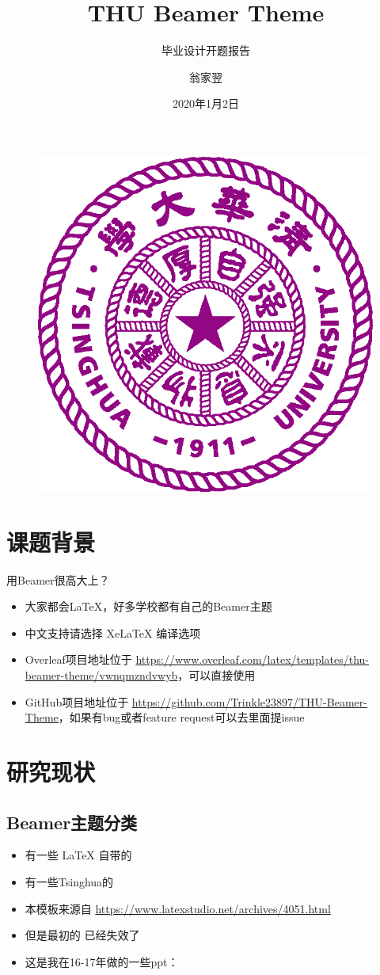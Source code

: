 \documentclass{beamer}
\author{翁家翌}
\title{THU Beamer Theme}
\subtitle{毕业设计开题报告}
\institute{清华大学计算机科学与技术系}
\date{2020年1月2日}
\begin{document}
\kaishu
\begin{frame}
	\titlepage
	\begin{figure}[htpb]
		\begin{center}
			\includegraphics[width=0.2\linewidth]{pic/Tsinghua_University_Logo.eps}
		\end{center}
	\end{figure}
\end{frame}
\begin{frame}
\tableofcontents[sectionstyle=show,subsectionstyle=show/shaded/hide,subsubsectionstyle=show/shaded/hide]
\end{frame}


\section{课题背景}

\begin{frame}{用Beamer很高大上？}
\begin{itemize}[<+-| alert@+>] %
\item 大家都会\LaTeX{}，好多学校都有自己的Beamer主题
\item 中文支持请选择 Xe\LaTeX{} 编译选项
\item Overleaf项目地址位于 \url{https://www.overleaf.com/latex/templates/thu-beamer-theme/vwnqmzndvwyb}，可以直接使用
\item GitHub项目地址位于 \url{https://github.com/Trinkle23897/THU-Beamer-Theme}，如果有bug或者feature request可以去里面提issue
\end{itemize}
\end{frame}

\section{研究现状}

\subsection{Beamer主题分类}

\begin{frame}
\begin{itemize}
\item 有一些 \LaTeX{} 自带的
\item 有一些Tsinghua的
\item 本模板来源自 \newline \url{https://www.latexstudio.net/archives/4051.html}
\item 但是最初的 \href{http://far.tooold.cn/post/latex/beamertsinghua}{\color{purple}{link}} \cite{origin}已经失效了
\item 这是我在16-17年做的一些ppt：\href{https://github.com/Trinkle23897/oi_slides}{\color{purple}{戳我}}
\end{itemize}
\end{frame}
\end{document}
